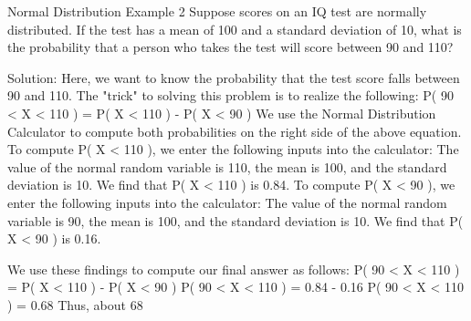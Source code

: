\documentclass[12pt, a4paper]{report}
\theoremstyle{definition}
\theoremstyle{remark}
\begin{document}
Normal Distribution Example 2
Suppose scores on an IQ test are normally distributed. If the test has a mean of 100 and a standard deviation of 10, what is the probability that a person who takes the test will score between 90 and 110?

Solution: Here, we want to know the probability that the test score falls between 90 and 110. The "trick" to solving this problem is to realize the following:
P( 90 < X < 110 ) = P( X < 110 ) - P( X < 90 )
We use the Normal Distribution Calculator to compute both probabilities on the right side of the above equation.
To compute P( X < 110 ), we enter the following inputs into the calculator: The value of the normal random variable is 110, the mean is 100, and the standard deviation is 10. We find that P( X < 110 ) is 0.84.
To compute P( X < 90 ), we enter the following inputs into the calculator: The value of the normal random variable is 90, the mean is 100, and the standard deviation is 10. We find that P( X < 90 ) is 0.16.

We use these findings to compute our final answer as follows:
P( 90 < X < 110 ) = P( X < 110 ) - P( X < 90 )
P( 90 < X < 110 ) = 0.84 - 0.16
P( 90 < X < 110 ) = 0.68
Thus, about 68%

 
\end{document}
